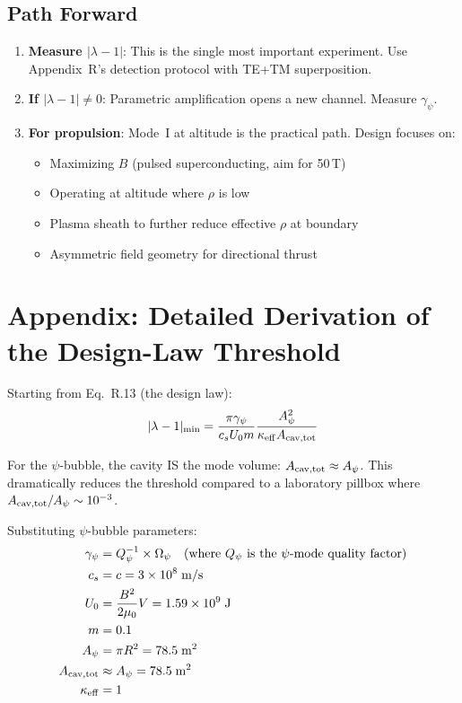 \documentclass[12pt,letterpaper]{article}
\begin{document}
\subsection{Path Forward}

\begin{enumerate}
\item \textbf{Measure $|\lambda - 1|$}: This is the single most important experiment. Use Appendix~R's detection protocol with TE+TM superposition.
\item \textbf{If $|\lambda - 1| \neq 0$}: Parametric amplification opens a new channel. Measure $\gamma_\psi$.
\item \textbf{For propulsion}: Mode~I at altitude is the practical path. Design focuses on:
\begin{itemize}
\item Maximizing $B$ (pulsed superconducting, aim for 50\,T)
\item Operating at altitude where $\rho$ is low
\item Plasma sheath to further reduce effective $\rho$ at boundary
\item Asymmetric field geometry for directional thrust
\end{itemize}
\end{enumerate}

\section{Appendix: Detailed Derivation of the Design-Law Threshold}
\label{sec:app-design}

Starting from Eq.~R.13 (the design law):
\begin{equation}
|\lambda - 1|_{\rm min} = \frac{\pi\gamma_\psi}{c_s U_0 m}\frac{A_\psi^2}{\kappa_{\rm eff}A_{\rm cav,tot}}
\end{equation}

For the $\psi$-bubble, the cavity IS the mode volume: $A_{\rm cav,tot} \approx A_\psi$. This dramatically reduces the threshold compared to a laboratory pillbox where $A_{\rm cav,tot}/A_\psi \sim 10^{-3}$.

Substituting $\psi$-bubble parameters:
\begin{align}
\gamma_\psi &= Q_\psi^{-1} \times \Omega_\psi \quad \text{(where $Q_\psi$ is the $\psi$-mode quality factor)} \\
c_s &= c = 3 \times 10^8\;\text{m/s} \\
U_0 &= \frac{B^2}{2\mu_0}V = 1.59 \times 10^9\;\text{J} \\
m &= 0.1 \\
A_\psi &= \pi R^2 = 78.5\;\text{m}^2 \\
A_{\rm cav,tot} &\approx A_\psi = 78.5\;\text{m}^2 \\
\kappa_{\rm eff} &= 1
\end{align}
\end{document}
